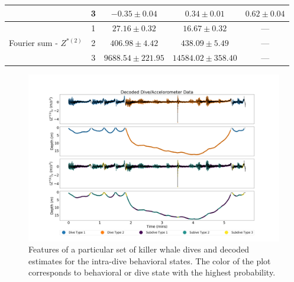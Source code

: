 \begin{table}[ht]
{\begin{tabular}{ccccc}
                                             & 3                                    & $-0.35 \pm 0.04$ & $0.34 \pm 0.01$ & $0.62 \pm 0.04$ \\ \hline
    \multirow{3}{*}{Fourier sum - $Z^{*(2)}$}              & 1                                    & $27.16 \pm 0.32$ & $16.67 \pm 0.32$ & ---             \\
                                             & 2                                    & $406.98 \pm 4.42$ & $438.09 \pm 5.49$ & ---             \\
                                             & 3                                    & $9688.54 \pm 221.95$ & $14584.02 \pm 358.40$ & ---             \\ \hline
    \end{tabular}
    }
    \label{table:emis_dists}
\end{table}

\begin{figure}[ht]
	\centering
	\includegraphics[width=5in]{../Plots/decoded_data.png}
	\caption{Features of a particular set of killer whale dives and decoded estimates for the intra-dive behavioral states. The color of the plot corresponds to behavioral or dive state with the highest probability.}
	\label{fig:labeled_dives}
\end{figure}

